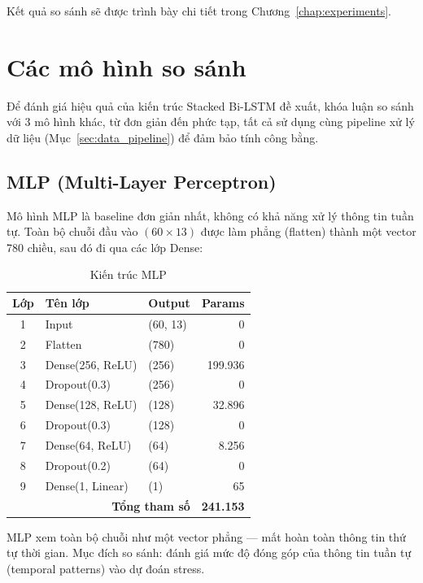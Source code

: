 Kết quả so sánh sẽ được trình bày chi tiết trong Chương~\ref{chap:experiments}.


\section{Các mô hình so sánh}
\label{sec:comparison_models}

Để đánh giá hiệu quả của kiến trúc Stacked Bi-LSTM đề xuất, khóa luận so sánh với 3 mô hình khác, từ đơn giản đến phức tạp, tất cả sử dụng cùng pipeline xử lý dữ liệu (Mục~\ref{sec:data_pipeline}) để đảm bảo tính công bằng.

\subsection{MLP (Multi-Layer Perceptron)}
\label{subsec:mlp_model}

Mô hình MLP là baseline đơn giản nhất, không có khả năng xử lý thông tin tuần tự. Toàn bộ chuỗi đầu vào $(60 \times 13)$ được làm phẳng (flatten) thành một vector 780 chiều, sau đó đi qua các lớp Dense:

\begin{table}[H]
\centering
\caption{Kiến trúc MLP}
\label{tab:mlp_architecture}
\small
\begin{tabular}{|c|l|l|r|}
\hline
\textbf{Lớp} & \textbf{Tên lớp} & \textbf{Output} & \textbf{Params} \\
\hline
1 & Input          & (60, 13)  & 0 \\
2 & Flatten        & (780)     & 0 \\
3 & Dense(256, ReLU) & (256)   & 199.936 \\
4 & Dropout(0.3)   & (256)     & 0 \\
5 & Dense(128, ReLU) & (128)   & 32.896 \\
6 & Dropout(0.3)   & (128)     & 0 \\
7 & Dense(64, ReLU)  & (64)    & 8.256 \\
8 & Dropout(0.2)   & (64)      & 0 \\
9 & Dense(1, Linear) & (1)     & 65 \\
\hline
\multicolumn{3}{|r|}{\textbf{Tổng tham số}} & \textbf{241.153} \\
\hline
\end{tabular}
\end{table}

MLP xem toàn bộ chuỗi như một vector phẳng — mất hoàn toàn thông tin thứ tự thời gian. Mục đích so sánh: đánh giá mức độ đóng góp của thông tin tuần tự (temporal patterns) vào dự đoán stress.

